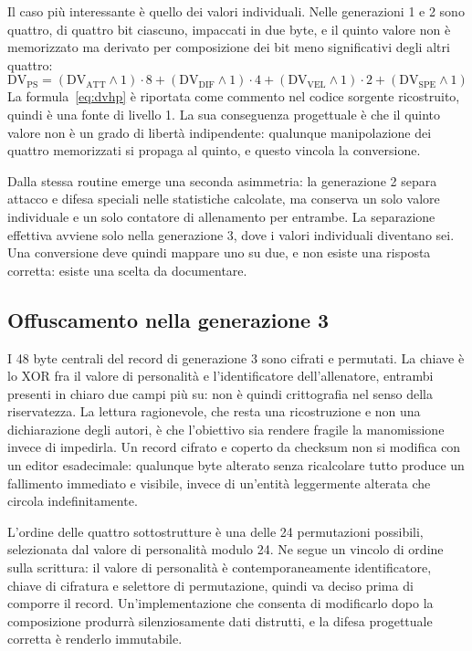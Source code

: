 \documentclass[11pt,a4paper]{article}
\begin{document}
Il caso più interessante è quello dei valori individuali. Nelle generazioni 1 e 2 sono quattro, di quattro bit ciascuno, impaccati in due byte, e il quinto valore non è memorizzato ma derivato per composizione dei bit meno significativi degli altri quattro:
\begin{equation}
\mathrm{DV_{PS}} = (\mathrm{DV_{ATT}} \wedge 1)\cdot 8 + (\mathrm{DV_{DIF}} \wedge 1)\cdot 4 + (\mathrm{DV_{VEL}} \wedge 1)\cdot 2 + (\mathrm{DV_{SPE}} \wedge 1)
\label{eq:dvhp}
\end{equation}
La formula~\eqref{eq:dvhp} è riportata come commento nel codice sorgente ricostruito, quindi è una fonte di livello 1. La sua conseguenza progettuale è che il quinto valore non è un grado di libertà indipendente: qualunque manipolazione dei quattro memorizzati si propaga al quinto, e questo vincola la conversione.

Dalla stessa routine emerge una seconda asimmetria: la generazione 2 separa attacco e difesa speciali nelle statistiche calcolate, ma conserva un solo valore individuale e un solo contatore di allenamento per entrambe. La separazione effettiva avviene solo nella generazione 3, dove i valori individuali diventano sei. Una conversione deve quindi mappare uno su due, e non esiste una risposta corretta: esiste una scelta da documentare.

\subsection{Offuscamento nella generazione 3}

I 48 byte centrali del record di generazione 3 sono cifrati e permutati. La chiave è lo XOR fra il valore di personalità e l'identificatore dell'allenatore, entrambi presenti in chiaro due campi più su: non è quindi crittografia nel senso della riservatezza. La lettura ragionevole, che resta una ricostruzione e non una dichiarazione degli autori, è che l'obiettivo sia rendere fragile la manomissione invece di impedirla. Un record cifrato e coperto da checksum non si modifica con un editor esadecimale: qualunque byte alterato senza ricalcolare tutto produce un fallimento immediato e visibile, invece di un'entità leggermente alterata che circola indefinitamente.

L'ordine delle quattro sottostrutture è una delle 24 permutazioni possibili, selezionata dal valore di personalità modulo 24. Ne segue un vincolo di ordine sulla scrittura: il valore di personalità è contemporaneamente identificatore, chiave di cifratura e selettore di permutazione, quindi va deciso prima di comporre il record. Un'implementazione che consenta di modificarlo dopo la composizione produrrà silenziosamente dati distrutti, e la difesa progettuale corretta è renderlo immutabile.
\end{document}

